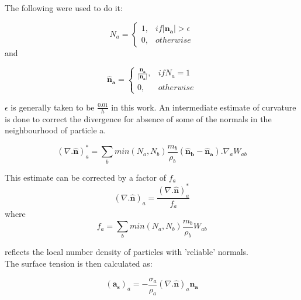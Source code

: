 \documentclass{beamer}
\begin{document}
\begin{frame}
The following were used to do it:

\begin{equation*}
 N_a = 
 \begin{cases}
  1, & if \left|\mathbf{n_a}\right| > \epsilon \\
  0, & otherwise
 \end{cases}
  \label{reliablity}
 \end{equation*}
\noindent
and

\begin{equation*}
 \mathbf{\hat n_a} = 
 \begin{cases}
  \frac{\mathbf{n_a}}{\left| \mathbf{n_a} \right|}, & if N_a=1 \\
  0, & otherwise
 \end{cases}
\end{equation*}

\noindent
$\epsilon$ is generally taken to be $\frac{0.01}{h}$ in this work. An intermediate estimate of curvature is done to correct the divergence for absence of some of the normals in the neighbourhood of particle a.

\begin{equation*}
 \left(\nabla. \mathbf{\hat n}\right)^*_a = \sum_b min(N_a, N_b) \frac{m_b}{\rho_b}(\mathbf{\hat n_b} - \mathbf{\hat n_a}). \nabla_a W_{ab}
\end{equation*}
\end{frame}

\begin{frame}
This estimate can be corrected by a factor of $f_a$
\begin{equation*}
 (\nabla . \mathbf{\hat n})_a = \frac{(\nabla . \mathbf{\hat n})_a^*}{f_a}
\end{equation*}
\noindent
where
\begin{equation*}
 f_a = \sum_b min(N_a, N_b) \frac{m_b}{\rho_b} W_{ab}
\end{equation*}

\noindent
reflects the local number density of particles with 'reliable' normals. \\

The surface tension is then calculated as:

\begin{equation*}
 (\mathbf{a_s})_a = -\frac{\sigma_a}{\rho_a}(\nabla.\mathbf{\hat n})_a \mathbf{n_a}
\end{equation*}

\end{frame}
\end{document}
